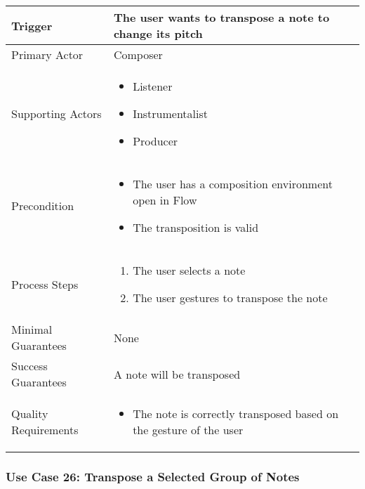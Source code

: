 \begin{tabularx}{\textwidth}{|X|X|}
\hline
Trigger & 
The user wants to transpose a note to change its pitch \\
\hline
Primary Actor & 
Composer \\
\hline
Supporting Actors & 
\begin{itemize}
\item Listener
\item Instrumentalist
\item Producer
\end{itemize} \\
\hline
Precondition & 
\begin{itemize}
\item The user has a composition environment open in Flow
\item The transposition is valid
\end{itemize} \\
\hline
Process Steps & 
\begin{enumerate}
\item The user selects a note
\item The user gestures to transpose the note
\end{enumerate} \\
\hline
Minimal Guarantees & 
None \\
\hline
Success Guarantees & 
A note will be transposed \\
\hline
Quality Requirements & 
\begin{itemize}
\item The note is correctly transposed based on the gesture of the user
\end{itemize} \\ 
\hline
\end{tabularx}

\subsubsection{Use Case 26: Transpose a Selected Group of Notes}

